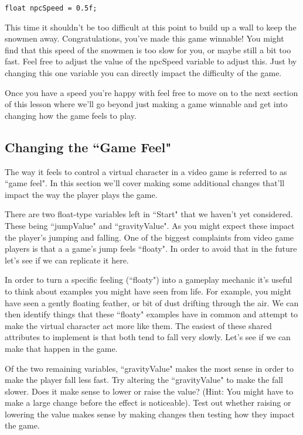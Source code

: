 \documentclass{article}
\begin{document}
\lstset{style=sharpc}
\begin{lstlisting}
float npcSpeed = 0.5f;
\end{lstlisting}

\noindent{}

This time it shouldn't be too difficult at this point to build up a wall to keep the snowmen away. Congratulations, you've made this game winnable! You might find that this speed of the snowmen is too slow for you, or maybe still a bit too fast. Feel free to adjust the value of the npcSpeed variable to adjust this. Just by changing this one variable you can directly impact the difficulty of the game. 

Once you have a speed you're happy with feel free to move on to the next section of this lesson where we'll go beyond just making a game winnable and get into changing how the game feels to play. 

\subsection{Changing the ``Game Feel"}

 The way it feels to control a virtual character in a video game is referred to as ``game feel". In this section we'll cover making some additional changes that'll impact the way the player plays the game.

There are two float-type variables left in ``Start" that we haven't yet considered. These being ``jumpValue" and ``gravityValue". As you might expect these impact the player's jumping and falling. One of the biggest complaints from video game players is that a a game's jump feels ``floaty". In order to avoid that in the future let's see if we can replicate it here. 

In order to turn a specific feeling (``floaty") into a gameplay mechanic it's useful to think about examples you might have seen from life. For example, you might have seen a gently floating feather, or bit of dust drifting through the air. We can then identify things that these ``floaty" examples have in common and attempt to make the virtual character act more like them. The easiest of these shared attributes to implement is that both tend to fall very slowly. Let's see if we can make that happen in the game.

Of the two remaining variables, ``gravityValue" makes the most sense in order to make the player fall less fast. Try altering the ``gravityValue" to make the fall slower. Does it make sense to lower or raise the value? (Hint: You might have to make a large change before the effect is noticeable). Test out whether raising or lowering the value makes sense by making changes then testing how they impact the game.
\end{document}
